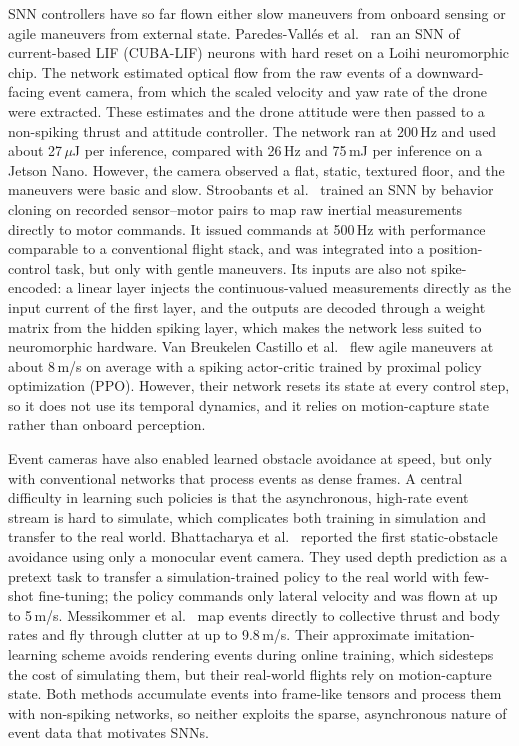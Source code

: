SNN controllers have so far flown either slow maneuvers from onboard sensing or agile maneuvers from external state. Paredes-Vall\'es et al.~\cite{paredes-vallesFullyNeuromorphicVision2023} ran an SNN of current-based LIF (CUBA-LIF) neurons with hard reset on a Loihi neuromorphic chip. The network estimated optical flow from the raw events of a downward-facing event camera, from which the scaled velocity and yaw rate of the drone were extracted. These estimates and the drone attitude were then passed to a non-spiking thrust and attitude controller. The network ran at 200\,Hz and used about 27\,$\mu$J per inference, compared with 26\,Hz and 75\,mJ per inference on a Jetson Nano. However, the camera observed a flat, static, textured floor, and the maneuvers were basic and slow. Stroobants et al.~\cite{stroobantsNeuromorphicAttitudeEstimation2025} trained an SNN by behavior cloning on recorded sensor--motor pairs to map raw inertial measurements directly to motor commands. It issued commands at 500\,Hz with performance comparable to a conventional flight stack, and was integrated into a position-control task, but only with gentle maneuvers. Its inputs are also not spike-encoded: a linear layer injects the continuous-valued measurements directly as the input current of the first layer, and the outputs are decoded through a weight matrix from the hidden spiking layer, which makes the network less suited to neuromorphic hardware. Van Breukelen Castillo et al.~\cite{vanbreukelencastilloSpikingNeuralNetworks2026} flew agile maneuvers at about 8\,m/s on average with a spiking actor-critic trained by proximal policy optimization (PPO). However, their network resets its state at every control step, so it does not use its temporal dynamics, and it relies on motion-capture state rather than onboard perception.

Event cameras have also enabled learned obstacle avoidance at speed, but only with conventional networks that process events as dense frames. A central difficulty in learning such policies is that the asynchronous, high-rate event stream is hard to simulate, which complicates both training in simulation and transfer to the real world. Bhattacharya et al.~\cite{bhattacharyaMonocularEventBasedVision2024} reported the first static-obstacle avoidance using only a monocular event camera. They used depth prediction as a pretext task to transfer a simulation-trained policy to the real world with few-shot fine-tuning; the policy commands only lateral velocity and was flown at up to 5\,m/s. Messikommer et al.~\cite{messikommerApproximateImitationLearning} map events directly to collective thrust and body rates and fly through clutter at up to 9.8\,m/s. Their approximate imitation-learning scheme avoids rendering events during online training, which sidesteps the cost of simulating them, but their real-world flights rely on motion-capture state. Both methods accumulate events into frame-like tensors and process them with non-spiking networks, so neither exploits the sparse, asynchronous nature of event data that motivates SNNs.

